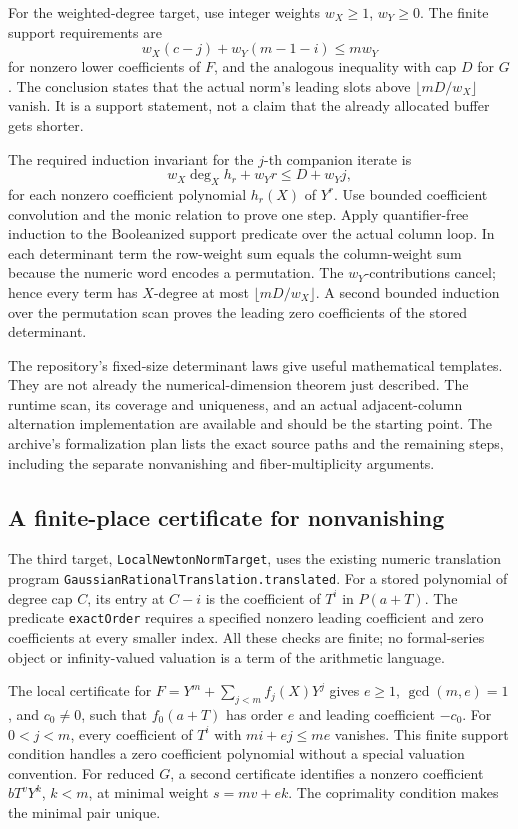 For the weighted-degree target, use integer weights
\(w_X\geq1\), \(w_Y\geq0\).  The finite support requirements are
\[
 w_X(c-j)+w_Y(m-1-i)\leq mw_Y
\]
for nonzero lower coefficients of \(F\), and the analogous inequality
with cap \(D\) for \(G\).  The conclusion states that the actual norm's
leading slots above \(\lfloor mD/w_X\rfloor\) vanish.  It is a support
statement, not a claim that the already allocated buffer gets shorter.

The required induction invariant for the \(j\)-th companion iterate is
\[
 w_X\deg_X h_r+w_Yr\leq D+w_Yj,
\]
for each nonzero coefficient polynomial \(h_r(X)\) of \(Y^r\).
Use bounded coefficient convolution and the monic relation to prove one
step.  Apply quantifier-free induction to the Booleanized support
predicate over the actual column loop.  In each determinant term the
row-weight sum equals the column-weight sum because the numeric word
encodes a permutation.  The \(w_Y\)-contributions cancel; hence every
term has \(X\)-degree at most \(\lfloor mD/w_X\rfloor\).
A second bounded induction over the permutation scan proves the leading
zero coefficients of the stored determinant.

The repository's fixed-size determinant laws give useful mathematical
templates.  They are not already the numerical-dimension theorem just
described.  The runtime scan, its coverage and uniqueness, and an actual
adjacent-column alternation implementation are available and should be
the starting point.  The archive's formalization plan lists the exact
source paths and the remaining steps, including the separate
nonvanishing and fiber-multiplicity arguments.

\subsection{A finite-place certificate for nonvanishing}

The third target, \texttt{LocalNewtonNormTarget}, uses the existing
numeric translation program
\texttt{GaussianRationalTranslation.translated}.
For a stored polynomial of degree cap \(C\), its entry at \(C-i\)
is the coefficient of \(T^i\) in \(P(a+T)\).
The predicate \texttt{exactOrder} requires a specified nonzero leading
coefficient and zero coefficients at every smaller index.
All these checks are finite; no formal-series object or infinity-valued
valuation is a term of the arithmetic language.

The local certificate for
\(F=Y^m+\sum_{j<m} f_j(X)Y^j\) gives \(e\geq1\),
\(\gcd(m,e)=1\), and \(c_0\ne0\), such that \(f_0(a+T)\)
has order \(e\) and leading coefficient \(-c_0\).
For \(0<j<m\), every coefficient of \(T^i\) with
\(mi+ej\leq me\) vanishes.  This finite support condition handles a
zero coefficient polynomial without a special valuation convention.
For reduced \(G\), a second certificate identifies a nonzero coefficient
\(bT^vY^k\), \(k<m\), at minimal weight \(s=mv+ek\).
The coprimality condition makes the minimal pair unique.

